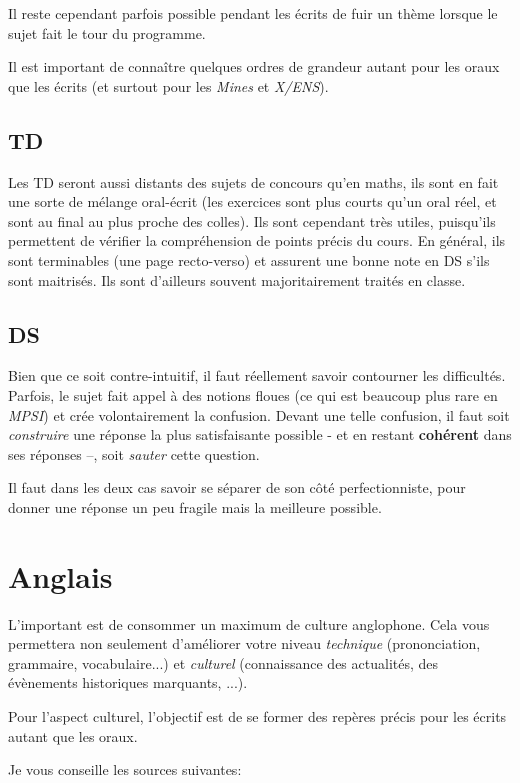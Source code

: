 \documentclass{article}
\begin{document}
Il reste cependant parfois possible pendant les écrits de fuir un thème lorsque le sujet fait le tour du programme.

Il est important de connaître quelques ordres de grandeur autant pour les oraux que les écrits (et surtout pour les \textit{Mines} et \textit{X/ENS}).

\subsection{TD}
Les TD seront aussi distants des sujets de concours qu'en maths, ils sont en fait une sorte de mélange oral-écrit (les exercices sont plus courts qu'un oral réel, et sont au final au plus proche des colles).
Ils sont cependant très utiles, puisqu'ils permettent de vérifier la compréhension de points précis du cours.
En général, ils sont terminables (une page recto-verso) et assurent une bonne note en DS s'ils sont maitrisés.
Ils sont d'ailleurs souvent majoritairement traités en classe.

\subsection{DS}
Bien que ce soit contre-intuitif, il faut réellement savoir contourner les difficultés.
Parfois, le sujet fait appel à des notions floues (ce qui est beaucoup plus rare en \textit{MPSI}) et crée volontairement la confusion.
Devant une telle confusion, il faut soit \textit{construire} une réponse la plus satisfaisante possible - et en restant \textbf{cohérent} dans ses réponses --, soit \textit{sauter} cette question.

Il faut dans les deux cas savoir se séparer de son côté perfectionniste, pour donner une réponse un peu fragile mais la meilleure possible.

\section{Anglais}
L'important est de consommer un maximum de culture anglophone.
Cela vous permettera non seulement d'améliorer votre niveau \textit{technique} (prononciation, grammaire, vocabulaire...) et \textit{culturel} (connaissance des actualités, des évènements historiques marquants, ...).

Pour l'aspect culturel, l'objectif est de se former des repères précis pour les écrits autant que les oraux.

Je vous conseille les sources suivantes:
\end{document}
